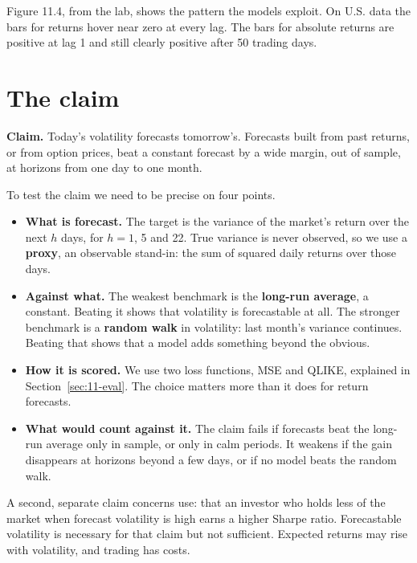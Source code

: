 Figure 11.4, from the lab, shows the pattern the models exploit. On U.S. data the bars for returns hover near zero at every lag. The bars for absolute returns are positive at lag 1 and still clearly positive after 50 trading days.

\section{The claim}
\label{sec:11-claim}

\begin{callout}
\textbf{Claim.} Today's volatility forecasts tomorrow's. Forecasts built from past returns, or from option prices, beat a constant forecast by a wide margin, out of sample, at horizons from one day to one month.
\end{callout}

To test the claim we need to be precise on four points.

\begin{itemize}
  \item \textbf{What is forecast.} The target is the variance of the market's return over the next $h$ days, for $h = 1$, 5 and 22. True variance is never observed, so we use a \textbf{proxy}, an observable stand-in: the sum of squared daily returns over those days.
  \item \textbf{Against what.} The weakest benchmark is the \textbf{long-run average}, a constant. Beating it shows that volatility is forecastable at all. The stronger benchmark is a \textbf{random walk} in volatility: last month's variance continues. Beating that shows that a model adds something beyond the obvious.
  \item \textbf{How it is scored.} We use two loss functions, MSE and QLIKE, explained in Section~\ref{sec:11-eval}. The choice matters more than it does for return forecasts.
  \item \textbf{What would count against it.} The claim fails if forecasts beat the long-run average only in sample, or only in calm periods. It weakens if the gain disappears at horizons beyond a few days, or if no model beats the random walk.
\end{itemize}

A second, separate claim concerns use: that an investor who holds less of the market when forecast volatility is high earns a higher Sharpe ratio. Forecastable volatility is necessary for that claim but not sufficient. Expected returns may rise with volatility, and trading has costs.

